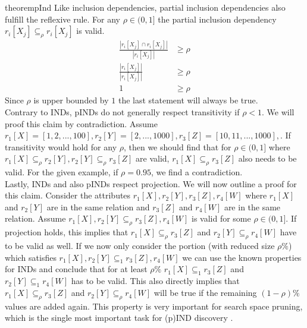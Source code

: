 \begin{restatable}{theorem}{pInd}\label{theo:pInd}
    Like inclusion dependencies, partial inclusion dependencies also fulfill the reflexive rule. For any $\rho \in (0, 1]$ the partial inclusion dependency $r_i[X_j] \subseteq_{\rho} r_i[X_j]$ is valid.
    \begin{align*}
        \frac{|r_i[X_j] \cap r_i[X_j]|}
            {|r_i[X_j]|} & \geq \rho \\
        \frac{|r_i[X_j]|}
            {|r_i[X_j]|} & \geq \rho \\
            1 & \geq \rho
     \end{align*}
     Since $\rho$ is upper bounded by $1$ the last statement will always be true. \\

     \noindent Contrary to INDs, pINDs do not generally respect transitivity if $\rho < 1$. We will proof this claim by contradiction. Assume $r_1[X] = [1, 2, ..., 100], r_2[Y] = [2, ..., 1000], r_3[Z] = [10, 11, ..., 1000],$. If transitivity would hold for any $\rho$, then we should find that for $\rho \in (0, 1]$ where $r_1[X] \subseteq_\rho r_2[Y], r_2[Y] \subseteq_\rho  r_3[Z]$ are valid, $ r_1[X] \subseteq_\rho  r_3[Z]$ also needs to be valid. For the given example, if $\rho = 0.95$, we find a contradiction. \\

     \noindent Lastly, INDs and also pINDs respect projection. We will now outline a proof for this claim. Consider the attributes $r_1[X], r_2[Y], r_3[Z], r_4[W]$ where $r_1[X]$ and $r_2[Y]$ are in the same relation and $r_3[Z]$ and $r_4[W]$ are in the same relation. Assume $r_1[X], r_2[Y] \subseteq_\rho r_3[Z], r_4[W]$ is valid for some $\rho \in (0, 1]$. If projection holds, this implies that $r_1[X] \subseteq_\rho r_3[Z]$ and $r_2[Y] \subseteq_\rho r_4[W]$ have to be valid as well. If we now only consider the portion (with reduced size $\rho\%$) which satisfies $r_1[X], r_2[Y] \subseteq_1 r_3[Z], r_4[W]$ we can use the known properties for INDs and conclude that for at least $\rho\%$ $r_1[X] \subseteq_1 r_3[Z]$ and $r_2[Y] \subseteq_1 r_4[W]$ has to be valid. This also directly implies that $r_1[X] \subseteq_\rho r_3[Z]$ and $r_2[Y] \subseteq_\rho r_4[W]$ will be true if the remaining $(1-\rho)\%$ values are added again. This property is very important for search space pruning, which is the single most important task for (p)IND discovery \cite{liu2010discover}.
\end{restatable}

